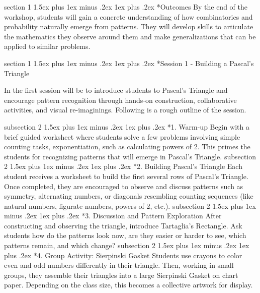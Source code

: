 \documentclass[a4paper,twoside,notitlepage,
11pt,
]{amsart}
\makeatletter
\renewcommand{\section}{\@startsection
  {section}%
  {1}%
  {\z@}%
  {1.5ex plus 1ex minus .2ex}%
  {1ex plus .2ex}%
  {\normalfont\bfseries}}%
\renewcommand{\subsection}{\@startsection
    {subsection}%
    {2}%
    {\z@}%
    {1.5ex plus 1ex minus .2ex}%
    {1ex plus .2ex}%
    {\normalfont\itshape}}%
\makeatother
\begin{document}
\section*{Outcomes}
By the end of the workshop, students will gain a concrete understanding of how combinatorics and probability naturally emerge from patterns. They will develop skills to articulate the mathematics they observe around them and make generalizations that can be applied to similar problems.

\section*{Session 1 - Building a Pascal's Triangle}

In the first session will be to introduce students to Pascal's Triangle and encourage pattern recognition through hands-on construction, collaborative activities, and visual re-imaginings. Following is a rough outline of the session.

\subsection*{1. Warm-up}
Begin with a brief guided worksheet where students solve a few problems involving simple counting tasks, exponentiation, such as calculating powers of 2. This primes the students for recognizing patterns that will emerge in Pascal's Triangle.
\subsection*{2. Building Pascal's Triangle}
Each student receives a worksheet to build the first several rows of Pascal’s Triangle. Once completed, they are encouraged to observe and discuss patterns such as symmetry, alternating numbers, or diagonals resembling counting sequences (like natural numbers, figurate numbers, powers of 2, etc.).
\subsection*{3. Discussion and Pattern Exploration}
After constructing and observing the triangle, introduce Tartaglia's Rectangle. Ask students how do the patterns look now, are they easier or harder to see, which patterns remain, and which change?
\subsection*{4. Group Activity: Sierpinski Gasket}
Students use crayons to color even and odd numbers differently in their triangle. Then, working in small groups, they assemble their triangles into a large Sierpinski Gasket on chart paper. Depending on the class size, this becomes a collective artwork for display.
\end{document}
